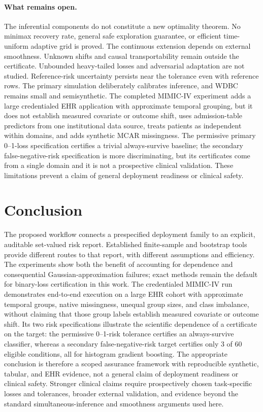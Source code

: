 \documentclass[twoside,11pt]{article}
\begin{document}
\paragraph{What remains open.}
The inferential components do not constitute a new optimality theorem. No minimax recovery
rate, general safe exploration guarantee, or efficient time-uniform adaptive grid is proved.
The continuous extension depends on external smoothness. Unknown shifts and causal
transportability remain outside the certificate. Unbounded heavy-tailed losses and adversarial
adaptation are not studied. Reference-risk uncertainty persists near the tolerance even with
\ReferenceN{} reference rows. The primary simulation deliberately calibrates inference, and
WDBC remains small and semisynthetic. The completed MIMIC-IV experiment adds a large
credentialed EHR application with approximate temporal grouping, but it does not establish
measured covariate or outcome shift, uses admission-table predictors from one institutional
data source, treats patients as independent within domains, and adds synthetic MCAR
missingness. The permissive primary 0--1-loss specification certifies a trivial always-survive
baseline; the secondary false-negative-risk specification is more discriminating, but its
certificates come from a single domain and it is not a prospective clinical validation. These
limitations prevent a claim of general deployment readiness or clinical safety.

\section{Conclusion}
The proposed workflow connects a prespecified deployment family to an explicit, auditable
set-valued risk report. Established finite-sample and bootstrap tools provide different routes to
that report, with different assumptions and efficiency. The experiments show both the benefit
of accounting for dependence and consequential Gaussian-approximation failures; exact methods
remain the default for binary-loss certification in this work. The credentialed MIMIC-IV run
demonstrates end-to-end execution on a large EHR cohort with approximate temporal groups,
native missingness, unequal group sizes, and class imbalance, without claiming that those group
labels establish measured covariate or outcome shift. Its two risk specifications illustrate the
scientific dependence of a certificate on the target: the permissive 0--1-risk tolerance certifies
an always-survive classifier, whereas a secondary false-negative-risk target certifies only 3 of
60 eligible conditions, all for histogram gradient boosting. The appropriate conclusion is
therefore a scoped assurance framework with reproducible synthetic, tabular, and EHR evidence,
not a general claim of deployment readiness or clinical safety. Stronger clinical claims require
prospectively chosen task-specific losses and tolerances, broader external validation, and
evidence beyond the standard simultaneous-inference and smoothness arguments used here.
\end{document}
